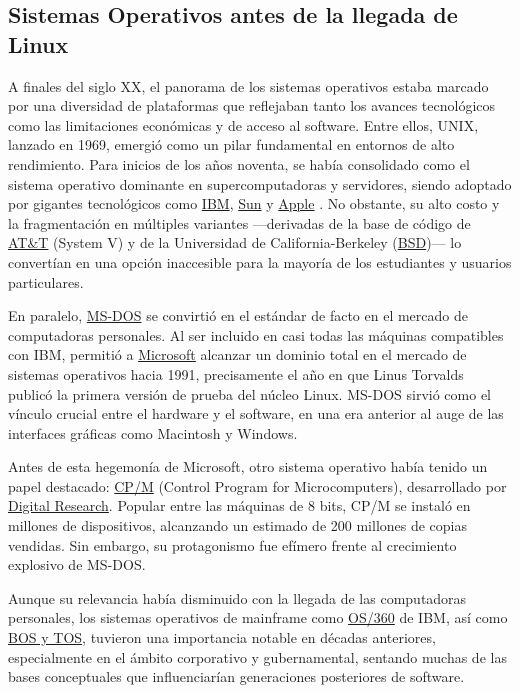 \documentclass[a4paper,12pt]{article}
\begin{document}
\subsection{Sistemas Operativos antes de la llegada de Linux}
A finales del siglo XX, el panorama de los sistemas operativos estaba marcado
por una diversidad de plataformas que reflejaban tanto los avances tecnológicos
como las limitaciones económicas y de acceso al software. Entre ellos,
UNIX, lanzado en 1969, emergió como un pilar fundamental en
entornos de alto rendimiento. Para inicios de los años noventa, se había
consolidado como el sistema operativo dominante en supercomputadoras y
servidores, siendo adoptado por gigantes tecnológicos como \hyperlink{ibm}{IBM},
\hyperlink{sun}{Sun} y \hyperlink{apple}{Apple} .  No obstante, su alto costo y la
fragmentación en múltiples variantes —derivadas de la base de código de
\hyperlink{att}{AT\&T} (System V) y de la Universidad de California-Berkeley
(\hyperlink{bsd}{BSD})— lo convertían en una opción inaccesible para la mayoría
de los estudiantes y usuarios particulares.

En paralelo, \hyperlink{msdos}{MS-DOS} se convirtió en el estándar de facto en el
mercado de computadoras personales. Al ser incluido en casi todas las máquinas
compatibles con IBM, permitió a \hyperlink{microsoft}{Microsoft}
alcanzar un dominio total en el mercado de sistemas operativos hacia 1991,
precisamente el año en que Linus Torvalds publicó la primera versión de prueba
del núcleo Linux. MS-DOS sirvió como el vínculo crucial entre
el hardware y el software, en una era anterior al auge de las interfaces
gráficas como Macintosh y Windows.

Antes de esta hegemonía de Microsoft, otro sistema operativo había tenido un
papel destacado: \hyperlink{cpm}{CP/M} (Control Program for Microcomputers),
desarrollado por \hyperlink{digitalresearch}{Digital Research}. Popular entre las
máquinas de 8 bits, CP/M se instaló en millones de dispositivos,
alcanzando un estimado de 200 millones de copias vendidas. Sin embargo, su
protagonismo fue efímero frente al crecimiento explosivo de
MS-DOS.

Aunque su relevancia había disminuido con la llegada de las computadoras
personales, los sistemas operativos de mainframe como \hyperlink{os360}{OS/360}
de IBM, así como \hyperlink{bostos}{BOS y TOS}, tuvieron una
importancia notable en décadas anteriores, especialmente en el ámbito
corporativo y gubernamental, sentando muchas de las bases conceptuales que
influenciarían generaciones posteriores de software.
\end{document}
